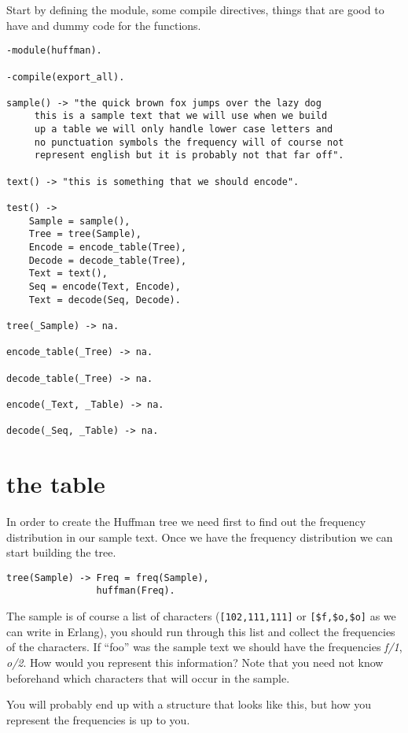 \documentclass[a4paper,11pt]{article}
\begin{document}
Start by defining the module, some compile directives, things that
are good to have and dummy code for the functions.

\begin{verbatim}
-module(huffman).

-compile(export_all).

sample() -> "the quick brown fox jumps over the lazy dog
     this is a sample text that we will use when we build 
     up a table we will only handle lower case letters and
     no punctuation symbols the frequency will of course not 
     represent english but it is probably not that far off".

text() -> "this is something that we should encode".

test() ->
    Sample = sample(),
    Tree = tree(Sample),
    Encode = encode_table(Tree),
    Decode = decode_table(Tree),
    Text = text(),
    Seq = encode(Text, Encode),
    Text = decode(Seq, Decode).
 
tree(_Sample) -> na.

encode_table(_Tree) -> na.

decode_table(_Tree) -> na.

encode(_Text, _Table) -> na.

decode(_Seq, _Table) -> na.
\end{verbatim}

\section{the table}

In order to create the Huffman tree we need first to find out the frequency
distribution in our sample text. Once we have the frequency
distribution we can start building the tree.

\begin{verbatim}
tree(Sample) -> Freq = freq(Sample),
                huffman(Freq).
\end{verbatim}

The sample is of course a list of characters ({\tt [102,111,111]} or
{\tt [\$f,\$o,\$o]} as we can write in Erlang), you should run through
this list and collect the frequencies of the characters. If ``foo''
was the sample text we should have the frequencies {\em f/1}, {\em
  o/2}. How would you represent this information? Note that you need
not know beforehand which characters that will occur in the sample.

You will probably end up with a structure that looks like this, but
how you represent the frequencies is up to you.
\end{document}

